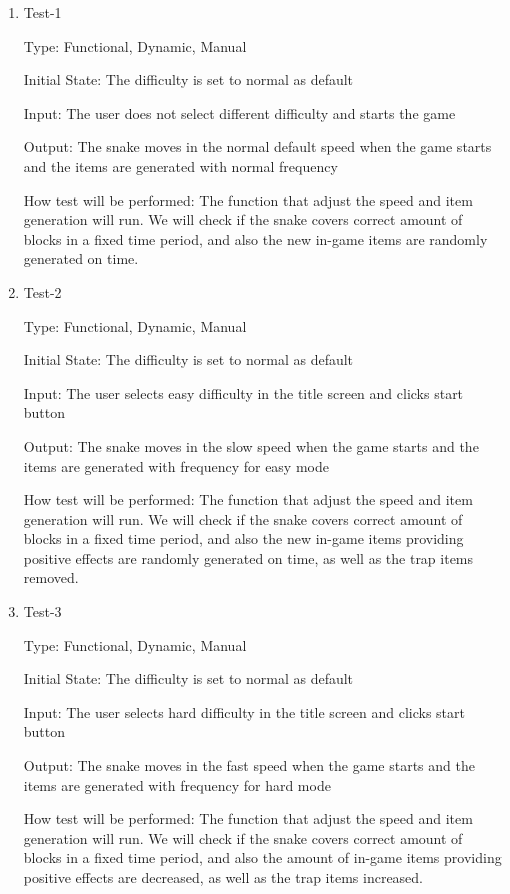 \documentclass[12pt, titlepage]{article}
\begin{document}
\begin{enumerate}

\item{Test-1\\}

Type: Functional, Dynamic, Manual

Initial State: The difficulty is set to normal as default

Input: The user does not select different difficulty and starts the game

Output: The snake moves in the normal default speed when the game starts and the items are generated with normal frequency

How test will be performed: The function that adjust the speed and item generation will run. We will check if the snake covers correct amount of blocks in a fixed time period, and also the new in-game items are randomly generated on time.

\item{Test-2\\}

Type: Functional, Dynamic, Manual

Initial State: The difficulty is set to normal as default

Input: The user selects easy difficulty in the title screen and clicks start button

Output: The snake moves in the slow speed when the game starts and the items are generated with  frequency for easy mode

How test will be performed: The function that adjust the speed and item generation will run. We will check if the snake covers correct amount of blocks in a fixed time period, and also the new in-game items providing positive effects are randomly generated on time, as well as the trap items removed.

\item{Test-3\\}

Type: Functional, Dynamic, Manual

Initial State: The difficulty is set to normal as default

Input: The user selects hard difficulty in the title screen and clicks start button

Output: The snake moves in the fast speed when the game starts and the items are generated with  frequency for hard mode

How test will be performed: The function that adjust the speed and item generation will run. We will check if the snake covers correct amount of blocks in a fixed time period, and also the amount of in-game items providing positive effects are decreased, as well as the trap items increased.


\end{enumerate}
\end{document}
